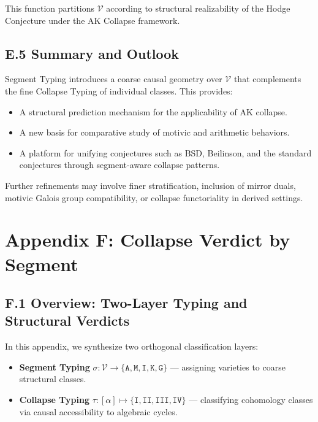 \documentclass[11pt]{article}
\begin{document}
This function partitions $\mathcal{V}$ according to structural realizability of the Hodge Conjecture under the AK Collapse framework.

\subsection*{E.5 Summary and Outlook}

Segment Typing introduces a coarse causal geometry over $\mathcal{V}$ that complements the fine Collapse Typing of individual classes. This provides:

\begin{itemize}
  \item A structural prediction mechanism for the applicability of AK collapse.
  \item A new basis for comparative study of motivic and arithmetic behaviors.
  \item A platform for unifying conjectures such as BSD, Beilinson, and the standard conjectures through segment-aware collapse patterns.
\end{itemize}

Further refinements may involve finer stratification, inclusion of mirror duals, motivic Galois group compatibility, or collapse functoriality in derived settings.



\section*{Appendix F: Collapse Verdict by Segment}


\subsection*{F.1 Overview: Two-Layer Typing and Structural Verdicts}

In this appendix, we synthesize two orthogonal classification layers:

\begin{itemize}
  \item \textbf{Segment Typing} $\sigma: \mathcal{V} \to \{ \texttt{A}, \texttt{M}, \texttt{I}, \texttt{K}, \texttt{G} \}$ — assigning varieties to coarse structural classes.
  \item \textbf{Collapse Typing} $\tau: [\alpha] \mapsto \{ \texttt{I}, \texttt{II}, \texttt{III}, \texttt{IV} \}$ — classifying cohomology classes via causal accessibility to algebraic cycles.
\end{itemize}
\end{document}
